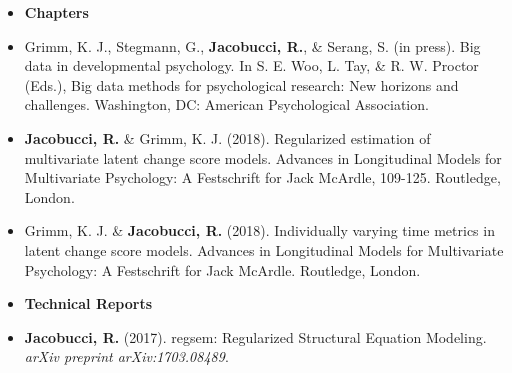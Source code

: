 \documentclass[letterpaper,10pt]{article}
\begin{document}
\begin{itemize}
\vspace{3mm}
%
%
\item {\textbf{\large{Chapters}}}
\item[]Grimm, K. J., Stegmann, G., \textbf{Jacobucci, R.}, \& Serang, S. (in press). Big data in developmental psychology. In S. E. Woo, L. Tay, \& R. W. Proctor (Eds.), Big data methods for psychological research: New horizons and challenges. Washington, DC: American Psychological Association.
%
\item[] \textbf{Jacobucci, R.} \& Grimm, K. J. (2018). Regularized estimation of multivariate latent change score models. Advances in Longitudinal Models for Multivariate Psychology: A Festschrift for Jack McArdle, 109-125. Routledge, London.
%
\item[] Grimm, K. J. \& \textbf{Jacobucci, R.} (2018). Individually varying time metrics in latent change score models. Advances in Longitudinal Models for Multivariate Psychology: A Festschrift for Jack McArdle. Routledge, London.
%
%
\vspace{3mm}
%
\item {\textbf{\large{Technical Reports}}}
\item[] \textbf{Jacobucci, R.} (2017). regsem: Regularized Structural Equation Modeling. \emph{arXiv preprint arXiv:1703.08489}.
\vspace{3mm}
%
%
%
%
%
%
%

\end{itemize}
\end{document}
